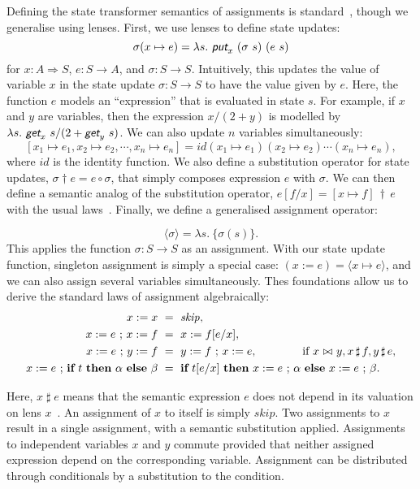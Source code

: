 \documentclass[envcountsame,envcountsect]{llncs}
\newcommand{\sskip}{\mathit{skip}}
\newcommand{\lput}{\textit{\textsf{put}}}
\newcommand{\lget}{\textit{\textsf{get}}}
\newcommand{\lto}{\Longrightarrow}
\newcommand{\lindep}{\mathop{\,\bowtie\,}}
\newcommand{\unrest}{\mathop{\sharp}}
\newcommand{\seq}{\mathop{\,;\,}}
\newcommand{\subapp}{\mathop{\,\dagger\,}}
\begin{document}
Defining the state transformer semantics of assignments is
standard~\cite{MuniveS19}, though we generalise using lenses. First,
we use lenses to define state updates:
$$\sigma(x\mapsto e) = \lambda s.\ \lput_x ~ (\sigma~s) ~ (e~s)$$
for $x : A \lto S$, $e : S \to A$, and $\sigma : S \to S$.
Intuitively, this updates the value of variable $x$ in the state
update $\sigma : S \to S$ to have the value given by $e$. Here, the
function $e$ models an ``expression'' that is evaluated in
state $s$. For example, if $x$ and $y$ are
variables, then the expression $x / (2 + y)$ is modelled by
$\lambda s. \ \lget_x~s / (2 + \lget_y~s)$. We can also update $n$
variables simultaneously:
$$[x_1 \mapsto e_1, x_2 \mapsto e_2, \cdots, x_n \mapsto e_n] = id(x_1 \mapsto e_1)(x_2 \mapsto e_2)\cdots(x_n \mapsto e_n),$$ 
where $id$ is the identity function. We also define a substitution
operator for state updates, $\sigma \dagger e = e \circ \sigma$, that
simply composes expression $e$ with $\sigma$. We can then define a
semantic analog of the substitution operator,
$e[f/x] = [x \mapsto f] \subapp e$ with the usual
laws~\cite{FosterZW16}. Finally, we define a generalised assignment
operator:

\begin{equation}
  \langle \sigma \rangle = \lambda s.\ \{ \sigma(s) \}.\tag{st-assgn}
\end{equation}
%
This applies the function $\sigma : S \to S$ as an assignment. With
our state update function, singleton assignment is simply a special
case: $(x := e) =\langle x \mapsto e \rangle$, and we can also assign
several variables simultaneously. Thes foundations allow us to derive
the standard laws of assignment algebraically:
%
\begin{align*}
  x := x &~=~ \sskip, \\
  x := e \seq x := f &~=~ x := f[e/x], \\
  x := e \seq y := f &~=~ y := f \seq x := e, \qquad\qquad
                       \textnormal{if~} x \lindep y, x \unrest f, y
                       \unrest e, \\
  x := e \seq \textbf{if}~ t ~ \textbf{then}~ \alpha ~ \textbf{else}~ \beta 
                          &~=~ \textbf{if}~ t[e/x]  ~\textbf{then}~ x := e \seq \alpha  ~\textbf{else}~ x := e \seq \beta.
\end{align*}

Here, $x \unrest e$ means that the semantic expression $e$ does not
depend in its valuation on lens $x$~\cite{FosterZW16}. An assignment
of $x$ to itself is simply $\sskip$. Two assignments to $x$ result in
a single assignment, with a semantic substitution applied. Assignments
to independent variables $x$ and $y$ commute provided that neither
assigned expression depend on the corresponding variable.  Assignment
can be distributed through conditionals by a substitution to the
condition.
\end{document}
